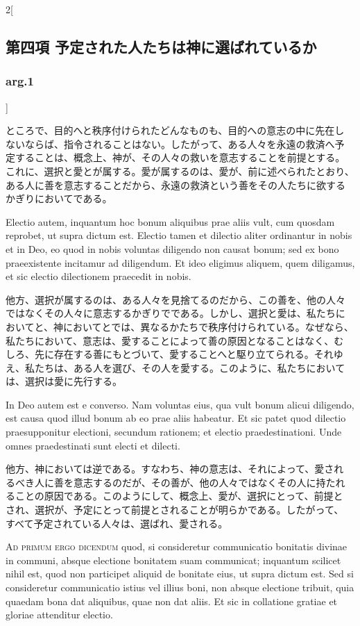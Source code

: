 \documentclass[paper=a4paper,fontsize=10pt,jafontsize=9pt,titlepage]{jlreq}
\begin{document}
\begin{paracol}{2}[\subsection{第四項 予定された人たちは神に選ばれているか}\subsubsection{arg.1}]
\switchcolumn


ところで、目的へと秩序付けられたどんなものも、目的への意志の中に先在し
ないならば、指令されることはない。したがって、ある人々を永遠の救済へ予
定することは、概念上、神が、その人々の救いを意志することを前提とする。
これに、選択と愛とが属する。愛が属するのは、愛が、前に述べられたとおり、
ある人に善を意志することだから、永遠の救済という善をその人たちに欲する
かぎりにおいてである。


\switchcolumn*


Electio autem, inquantum hoc bonum
 aliquibus prae aliis vult, cum quosdam reprobet, ut supra dictum
 est. Electio tamen et dilectio aliter ordinantur in nobis et in Deo, eo
 quod in nobis voluntas diligendo non causat bonum; sed ex bono
 praeexistente incitamur ad diligendum. Et ideo eligimus aliquem, quem
 diligamus, et sic electio dilectionem praecedit in nobis.


\switchcolumn


他方、選択が属するのは、ある人々を見捨てるのだから、この善を、他の人々
ではなくその人々に意志するかぎりでである。しかし、選択と愛は、私たちに
おいてと、神においてとでは、異なるかたちで秩序付けられている。なぜなら、
私たちにおいて、意志は、愛することによって善の原因となることはなく、む
しろ、先に存在する善にもとづいて、愛することへと駆り立てられる。それゆ
え、私たちは、ある人を選び、その人を愛する。このように、私たちにおいて
は、選択は愛に先行する。


\switchcolumn*


In Deo autem
 est e converso. Nam voluntas eius, qua vult bonum alicui diligendo, est
 causa quod illud bonum ab eo prae aliis habeatur. Et sic patet quod
 dilectio praesupponitur electioni, secundum rationem; et electio
 praedestinationi. Unde omnes praedestinati sunt electi et dilecti.


\switchcolumn


他方、神においては逆である。すなわち、神の意志は、それによって、愛され
るべき人に善を意志するのだが、その善が、他の人々ではなくその人に持たれ
ることの原因である。このようにして、概念上、愛が、選択にとって、前提と
され、選択が、予定にとって前提とされることが明らかである。したがって、
すべて予定されている人々は、選ばれ、愛される。


\switchcolumn*[\subsubsection{ad.1}]


{\scshape Ad primum ergo dicendum} quod, si consideretur
 communicatio bonitatis divinae in communi, absque electione bonitatem
 suam communicat; inquantum scilicet nihil est, quod non participet
 aliquid de bonitate eius, ut supra dictum est. Sed si consideretur
 communicatio istius vel illius boni, non absque electione tribuit, quia
 quaedam bona dat aliquibus, quae non dat aliis. Et sic in collatione
 gratiae et gloriae attenditur electio.



\end{paracol}
\end{document}
